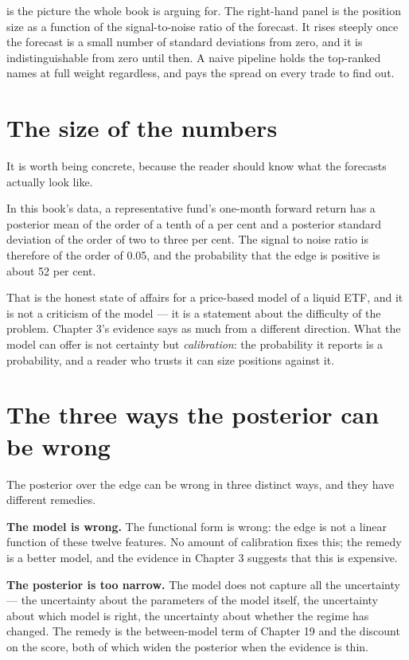  is the picture the whole book is arguing
for. The right-hand panel is the position size as a function of the
signal-to-noise ratio of the forecast. It rises steeply once the forecast
is a small number of standard deviations from zero, and it is
indistinguishable from zero until then. A naive pipeline holds the
top-ranked names at full weight regardless, and pays the spread on every
trade to find out.

\section{The size of the numbers}

It is worth being concrete, because the reader should know what the
forecasts actually look like.

In this book's data, a representative fund's one-month forward return has
a posterior mean of the order of a tenth of a per cent and a posterior
standard deviation of the order of two to three per cent. The signal to
noise ratio is therefore of the order of 0.05, and the probability that
the edge is positive is about 52 per cent.

That is the honest state of affairs for a price-based model of a liquid
ETF, and it is not a criticism of the model --- it is a statement about
the difficulty of the problem. Chapter 3's evidence says as much from a
different direction. What the model can offer is not certainty but
\emph{calibration}: the probability it reports is a probability, and a
reader who trusts it can size positions against it.

\section{The three ways the posterior can be wrong}

The posterior over the edge can be wrong in three distinct ways, and they
have different remedies.

\textbf{The model is wrong.} The functional form is wrong: the edge is not
a linear function of these twelve features. No amount of calibration
fixes this; the remedy is a better model, and the evidence in Chapter 3
suggests that this is expensive.

\textbf{The posterior is too narrow.} The model does not capture all the
uncertainty --- the uncertainty about the parameters of the model itself,
the uncertainty about which model is right, the uncertainty about whether
the regime has changed. The remedy is the between-model term of Chapter 19
and the discount on the score, both of which widen the posterior when the
evidence is thin.

